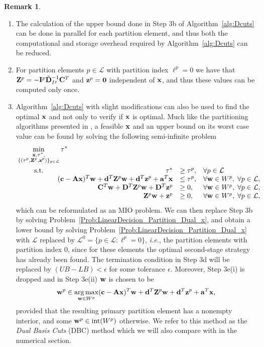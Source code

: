 \documentclass[12pt,x11names]{article}
\theoremstyle{definition}
\newtheorem{remark}{Remark} %
\newcommand{\inter}{\mathrm{int}} %
\newcommand{\ie}{{\em i.e.}, }
\newcommand{\bzero}{{\bf 0}}
\newcommand{\ba}{{\bf a}}
\newcommand{\bc}{{\bf c}}
\newcommand{\bd}{{\bf d}}
\newcommand{\bw}{{\bf w}}
\newcommand{\bx}{{\bf x}}
\newcommand{\bz}{{\bf z}}
\newcommand{\bba}{{\bf A}}
\newcommand{\bbc}{{\bf C}}
\newcommand{\bbd}{{\bf D}}
\newcommand{\bbi}{{\bf I}}
\newcommand{\bbz}{{\bf Z}}
\DeclareMathOperator*{\argmax}{arg\,max}
\begin{document}
\begin{remark}\label{rem:Dcuts}\leavevmode
\begin{enumerate}[label=({\roman*})]
\item The calculation of the upper bound done in Step 3b of Algorithm~\ref{alg:Dcuts} can be done in parallel for each partition element, and thus both the computational and storage overhead required by Algorithm~\ref{alg:Dcuts} can be reduced.
\item For partition elements $p\in \mathcal{L}$ with partition index $\ell^p=0$ we have that $\bbz^p=-\bbi^p\tilde{\bbd}_{I^p}^{-1}\bbc^T$ and $\bz^p=\bzero$ independent of $\bx$, and thus these values can be computed only once.
\item Algorithm~\ref{alg:Dcuts} with slight modifications can also be used to find the optimal $\bx$ and not only to verify if $\bx$ is optimal. Much like the partitioning algorithms presented in \citep{BertsimasDunning2014,PostekDenHertog2014}, a feasible $\bx$ and an upper bound on its worst case value can be found by solving the following semi-infinite problem
\begin{equation}\label{Prob:LinearDecision_Partition_Dual_x}
\begin{aligned}[t]
&\min\limits_{\substack{\bx,\tau^*,\\\{(\tau^p,\bbz^p,\bz^p)\}_{p\in\mathcal{L}}}} \tau^* \\
&\begin{array}{lrll}
\qquad\text{s.t.}\quad &\tau^*&\geq \tau^p,&\forall p\in\mathcal{L}\\
&(\bc-\bba\bx)^T\bw +\bd^T\bbz^p\bw+\bd^T\bz^p+\ba^T\bx&\leq \tau^p,&\forall \bw\in W^p,\;\forall p\in\mathcal{L},\\
&\bbc^T\bw+\bbd^T\bbz^p\bw+\bbd^T\bz^p&\geq0,&\forall \bw\in W^p,\;\forall p\in\mathcal{L},\\
&\bbz^p\bw+\bz^p&\geq 0,&\forall \bw\in W^p,\;\forall p\in\mathcal{L},
\end{array}
\end{aligned}
\end{equation}
which can be reformulated as an MIO problem.
We can then replace Step 3b by solving Problem~\eqref{Prob:LinearDecision_Partition_Dual_x}, and obtain a lower bound  by solving Problem~\eqref{Prob:LinearDecision_Partition_Dual_x} with $\mathcal{L}$ replaced by 
$\mathcal{L}^0=\{p\in\mathcal{L}:\ell^p=0\}$, \ie the partition elements with partition index $0$, since for these elements the optimal second-stage strategy has already been found. The termination condition in Step 3d will be replaced by $(UB-LB)<\epsilon$ for some tolerance $\epsilon$. Moreover, Step 3e(i) is dropped and in Step 3e(ii) $\bw$ is chosen to be $$\bw^p\in\argmax_{\bw\in W^p}(\bc-\bba\bx)^T\bw +\bd^T\bbz^p\bw+\bd^T\bz^p+\ba^T\bx,$$ provided that the resulting primary partition element has a nonempty interior, and some $\bw^p\in\inter(W^p)$ otherwise. We refer to this method as the \emph{Dual Basis Cuts} (DBC) method which we will also compare with in the numerical section. 
\end{enumerate}
\end{remark}
\end{document}
